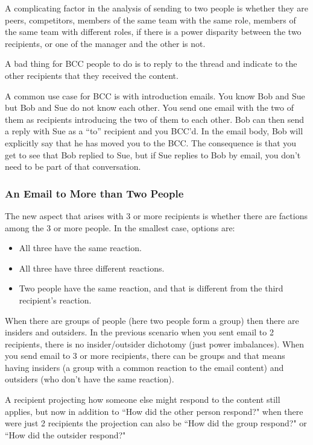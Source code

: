 A complicating factor in the analysis of sending to two people is whether they are peers, competitors, members of the same team with the same role, members of the same team with different roles, if there is a power disparity between the two recipients,  or one of the manager and the other is not.

A bad thing for BCC people to do is to reply to the thread and indicate to the other recipients that they received the content.

A common use case for BCC is with introduction emails. You know Bob and Sue but Bob and Sue do not know each other.  You send one email with the two of them as recipients introducing the two of them to each other. Bob can then send a reply with Sue as a ``to'' recipient and you BCC'd. In the email body, Bob will explicitly say that he has moved you to the BCC. The consequence is that you get to see that Bob replied to Sue, but if Sue replies to Bob by email, you don't need to be part of that conversation.



\subsubsection*{An Email to More than Two People}
The new aspect that arises with 3 or more recipients is whether there are factions among the 3 or more people. In the smallest case, options are:
\begin{itemize}
\item All three have the same reaction.
\item All three have three different reactions.
\item Two people have the same reaction, and that is different from the third recipient's reaction.
\end{itemize}
When there are groups of people (here two people form a group) then there are insiders and outsiders. In the previous scenario when you sent email to 2 recipients, there is no insider/outsider dichotomy (just power imbalances). When you send email to 3 or more recipients, there can be groups and that means having insiders (a group with a common reaction to the email content) and outsiders (who don't have the same reaction).

A recipient projecting how someone else might respond to the content still applies, but now in addition to ``How did the other person respond?" when there were just 2 recipients the projection can also be ``How did the group respond?" or ``How did the outsider respond?"



